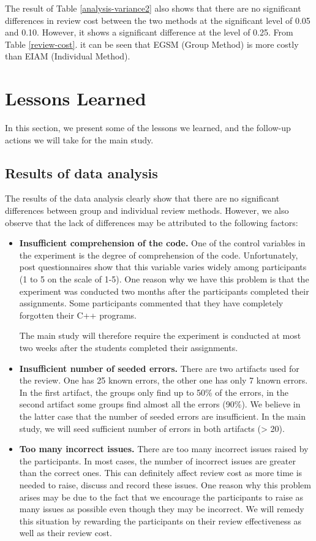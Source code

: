 The result of Table \ref{analysis-variance2} also shows that there are
no significant differences in review cost between the two methods at
the significant level of 0.05 and 0.10. However, it shows a
significant difference at the level of 0.25. From Table
\ref{review-cost}. it can be seen that EGSM (Group Method) is more
costly than EIAM (Individual Method).

\section{Lessons Learned}
In this section, we present some of the lessons we learned, and the
follow-up actions we will take for the main study.

\subsection{Results of data analysis}
The results of the data analysis clearly show that there are no
significant differences between group and individual review methods. 
However, we also observe that the lack of differences may be
attributed to the following factors:
\begin{itemize}
\item {\bf Insufficient comprehension of the code.}
One of the control variables in the experiment is the degree of
comprehension of the code. Unfortunately, post questionnaires show
that this variable varies widely among participants (1 to 5 on the
scale of 1-5).
One reason why we have this problem is that the experiment was
conducted two months after the participants completed their
assignments. Some participants commented that they have completely
forgotten their C++ programs. 

The main study will therefore require the experiment is conducted at
most two weeks after the students completed their assignments. 

\item {\bf Insufficient number of seeded errors.}
There are two artifacts used for the review. One has 25 known errors, the
other one has only 7 known errors.
In the first artifact, the groups only find up to 50\% of the errors, in
the second artifact some groups find almost all the errors (90\%). We
believe in the  latter case that the number of seeded errors are
insufficient. In the main study, we will seed sufficient number of
errors in both artifacts (> 20). 


\item {\bf Too many incorrect issues.}
There are too many incorrect issues raised by the participants. In most
cases, the number of incorrect issues are greater than the correct
ones. This can definitely affect review cost as more time is
needed to raise, discuss and record these issues.
One reason why this problem arises may be due to the fact that we 
encourage the participants to raise as many issues as possible 
even though they may be incorrect. We will remedy this situation by
rewarding the participants on their review effectiveness as well as
their review cost.

\end{itemize}

